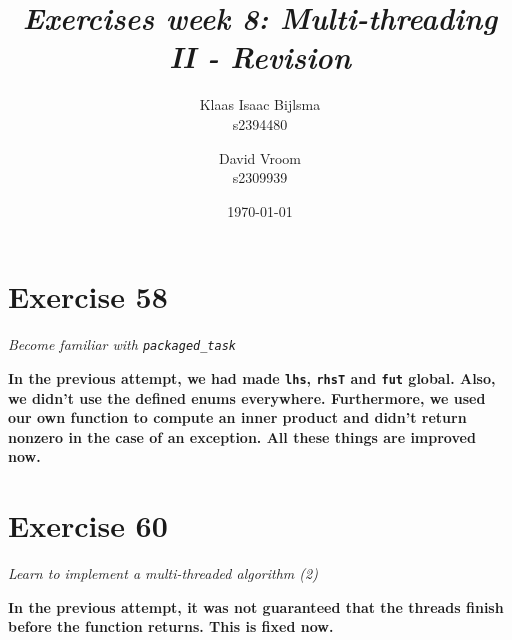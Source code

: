 \documentclass[12pt]{article}
\title{\itshape Exercises week 8: Multi-threading II - Revision}
\author{
	Klaas Isaac Bijlsma \\ s2394480
	\and
	David Vroom \\ s2309939
}
\date{\today}
\newcommand{\desc}[1]{\textit{#1} \vspace{1em}}
\begin{document}
\maketitle

\section*{Exercise 58}
\desc{Become familiar with \texttt{packaged\_task}}

\textbf{In the previous attempt, we had made \texttt{lhs}, \texttt{rhsT} and \texttt{fut} global. Also, we didn't use the defined enums everywhere. Furthermore, we used our own function to compute an inner product and didn't return nonzero in the case of an exception. All these things are improved now.}



\clearpage

\section*{Exercise 60}
\desc{Learn to implement a multi-threaded algorithm (2)}

\textbf{In the previous attempt, it was not guaranteed that the threads finish before the function returns. This is fixed now.}



\clearpage
\end{document}
